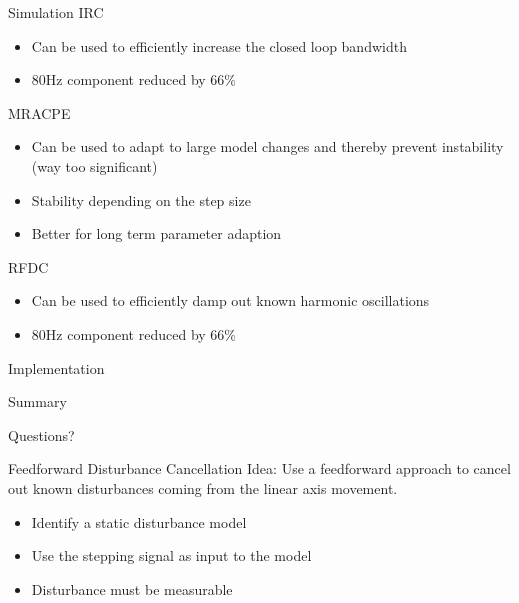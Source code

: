 \documentclass[10pt]{beamer}
\begin{document}
\begin{frame}{Simulation}
  IRC
  \begin{itemize}
    \item  Can be used to efficiently increase the closed loop bandwidth
    \item  80Hz component reduced by 66\%
  \end{itemize}
  MRACPE
  \begin{itemize}
    \item Can be used to adapt to large model changes and thereby prevent instability (way too significant)
    \item Stability depending on the step size
    \item Better for long term parameter adaption
  \end{itemize}
  RFDC
  \begin{itemize}
    \item Can be used to efficiently damp out known harmonic oscillations
    \item 80Hz component reduced by 66\%
  \end{itemize}
\end{frame}

\begin{frame}{Implementation}

\end{frame}

\begin{frame}{Summary}

\end{frame}

\begin{frame}[standout]
  Questions?
\end{frame}

\appendix


\begin{frame}{Feedforward Disturbance Cancellation}
  \alert{Idea}: Use a feedforward approach to cancel out known disturbances coming from the linear axis movement.
  \begin{itemize}
    \item Identify a static disturbance model
    \item Use the stepping signal as input to the model
    \item Disturbance must be measurable
  \end{itemize}
\end{frame}
\end{document}
